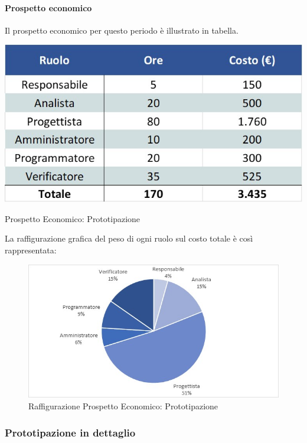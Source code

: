 \paragraph{Prospetto economico}
Il prospetto economico per questo periodo è illustrato in tabella. 
\begin{table}[H]
	\centerline{\includegraphics[scale=0.7]{img/Preventivo/PrototipazioneEconomico.jpg}}
	\caption{Prospetto Economico: Prototipazione}
	\clearpage
\end{table}
La raffigurazione grafica del peso di ogni ruolo sul costo totale è così rappresentata: 
\begin{figure}[H]
	\centerline{\includegraphics[scale=0.9]{img/Preventivo/Torte/Prototipazione.jpg}}
	\caption{Raffigurazione Prospetto Economico: Prototipazione}
	\clearpage
\end{figure}
\newpage
\subsubsection{Prototipazione in dettaglio}
